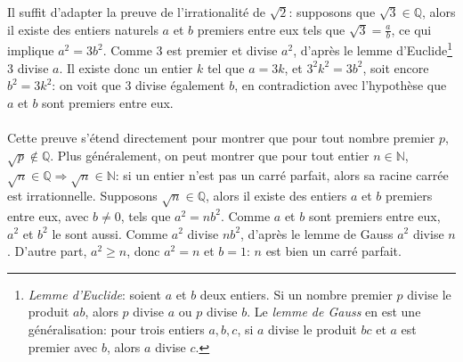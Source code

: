 Il suffit d'adapter la preuve de l’irrationalité de $\sqrt{2}$: supposons que $\sqrt{3}\in\mathbb{Q}$, alors il existe des entiers naturels $a$ et $b$ premiers entre eux tels que $\sqrt{3}=\frac{a}{b}$, ce qui implique $a^2=3b^2$. Comme 3 est premier et divise $a^2$, d’après le lemme d'Euclide\footnote{\textit{Lemme d'Euclide}: soient $a$ et $b$ deux entiers. Si un nombre premier $p$ divise le produit $ab$, alors $p$ divise $a$ ou $p$ divise $b$. Le \textit{lemme de Gauss} en est une généralisation: pour trois entiers $a,b,c$, si $a$ divise le produit $bc$ et $a$ est premier avec $b$, alors $a$ divise $c$.} 3 divise $a$. Il existe donc un entier $k$ tel que $a=3k$, et $3^2k^2=3b^2$, soit encore $b^2=3k^2$: on voit que 3 divise également $b$, en contradiction avec l’hypothèse que $a$ et $b$ sont premiers entre eux.\\ \\
Cette preuve s’étend directement pour montrer que pour tout nombre premier $p$, $\sqrt{p}\notin \mathbb{Q}$. Plus généralement, on peut montrer que pour tout entier $n\in \mathbb{N}$, $\sqrt{n}\in\mathbb{Q}\Rightarrow \sqrt{n}\in\mathbb{N}$: si un entier n'est pas un carré parfait, alors sa racine carrée est irrationnelle. Supposons $\sqrt{n}\in\mathbb{Q}$, alors il existe des entiers $a$ et $b$ premiers entre eux, avec $b\neq 0$, tels que $a^2=nb^2$. Comme $a$ et $b$ sont premiers entre eux, $a^2$ et $b^2$ le sont aussi. Comme $a^2$ divise $nb^2$, d’après le lemme de Gauss $a^2$ divise $n$. D'autre part, $a^2 \geq n$, donc $a^2=n$ et $b=1$: $n$ est bien un carré parfait.

